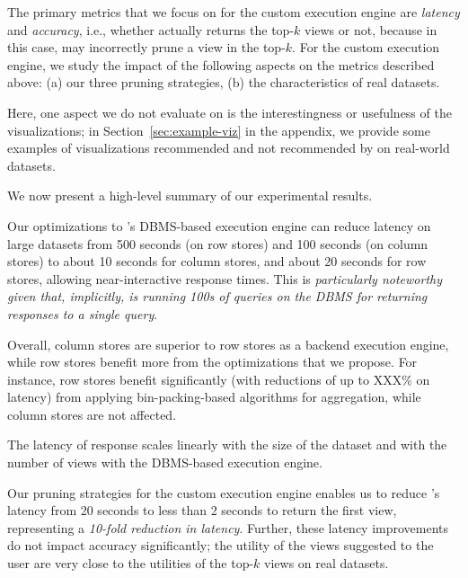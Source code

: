 The primary metrics that we focus on for the custom execution engine
are {\em latency} and {\em accuracy}, i.e., whether \VizRecDB
actually returns the top-$k$ views or not, because
in this case, \VizRecDB may incorrectly prune a view in the top-$k$.
For the custom execution engine, we study the impact of the following
aspects on the metrics described above:
(a) our three pruning strategies, 
(b) the characteristics of real datasets. 

Here, one aspect we do not evaluate \VizRecDB on is
the interestingness or usefulness of the visualizations;
in Section~\ref{sec:example-viz} in the appendix,
we provide some examples of visualizations recommended 
and not recommended by \VizRecDB on real-world
datasets. 



We now present a high-level summary of our experimental results. 
\squishlist
\item Our optimizations to \VizRecDB's DBMS-based execution engine can reduce
latency on large datasets from 500 seconds (on row stores) and 100 seconds (on column stores)
to about 10 seconds for column stores, and about 20 seconds for row stores,
allowing near-interactive response times. This is {\em particularly noteworthy given that, implicitly,
\VizRecDB is running 100s of queries on the DBMS for returning responses to a single \VizRecDB query}.

\item Overall, column stores are superior to row stores 
as a backend execution engine, while row stores benefit more from the optimizations 
that we propose. For instance, row stores benefit significantly (with reductions
of up to XXX\% on latency) from applying
bin-packing-based algorithms for aggregation, 
while column stores are not affected. 

\item The latency of response scales linearly 
with the size of the dataset and with the number of views with
the DBMS-based execution engine.

\item Our pruning strategies for the custom execution engine 
enables us to reduce \VizRecDB's latency from 20 seconds to less than 2 seconds
to return the first view, representing a {\em 10-fold reduction in latency}.
Further, these latency improvements do not impact accuracy significantly;
the utility of the views suggested to the user are very close to the utilities
of the top-$k$ views on real datasets.

